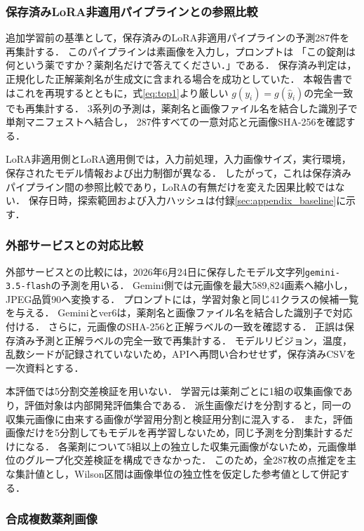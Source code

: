 \documentclass[uplatex,dvipdfmx]{jsarticle}
\begin{document}
\subsubsection{保存済みLoRA非適用パイプラインとの参照比較}

追加学習前の基準として，保存済みのLoRA非適用パイプラインの予測287件を再集計する．
このパイプラインは素画像を入力し，プロンプトは
「この錠剤は何という薬ですか？薬剤名だけで答えてください．」である．
保存済み判定は，正規化した正解薬剤名が生成文に含まれる場合を成功としていた．
本報告書ではこれを再現するとともに，式\eqref{eq:top1}より厳しい
$g(y_i)=g(\hat{y}_i)$の完全一致でも再集計する．
3系列の予測は，薬剤名と画像ファイル名を結合した識別子で単剤マニフェストへ結合し，
287件すべての一意対応と元画像SHA-256を確認する．

LoRA非適用側とLoRA適用側では，入力前処理，入力画像サイズ，実行環境，保存されたモデル情報および出力制御が異なる．
したがって，これは保存済みパイプライン間の参照比較であり，LoRAの有無だけを変えた因果比較ではない．
保存日時，探索範囲および入力ハッシュは付録\ref{sec:appendix_baseline}に示す．

\subsubsection{外部サービスとの対応比較}

外部サービスとの比較には，2026年6月24日に保存したモデル文字列\texttt{gemini-3.5-flash}の予測を用いる\cite{google_gemini35flash}．
Gemini側では元画像を最大589,824画素へ縮小し，JPEG品質90へ変換する．
プロンプトには，学習対象と同じ41クラスの候補一覧を与える．
Geminiとver6は，薬剤名と画像ファイル名を結合した識別子で対応付ける．
さらに，元画像のSHA-256と正解ラベルの一致を確認する．
正誤は保存済み予測と正解ラベルの完全一致で再集計する．
モデルリビジョン，温度，乱数シードが記録されていないため，APIへ再問い合わせせず，保存済みCSVを一次資料とする．

本評価では5分割交差検証を用いない．
学習元は薬剤ごとに1組の収集画像であり，評価対象は内部開発評価集合である．
派生画像だけを分割すると，同一の収集元画像に由来する画像が学習用分割と検証用分割に混入する．
また，評価画像だけを5分割してもモデルを再学習しないため，同じ予測を分割集計するだけになる．
各薬剤について5組以上の独立した収集元画像がないため，元画像単位のグループ化交差検証を構成できなかった．
このため，全287枚の点推定を主な集計値とし，Wilson区間は画像単位の独立性を仮定した参考値として併記する．

\subsubsection{合成複数薬剤画像}\label{sec:multi_eval}
\end{document}
